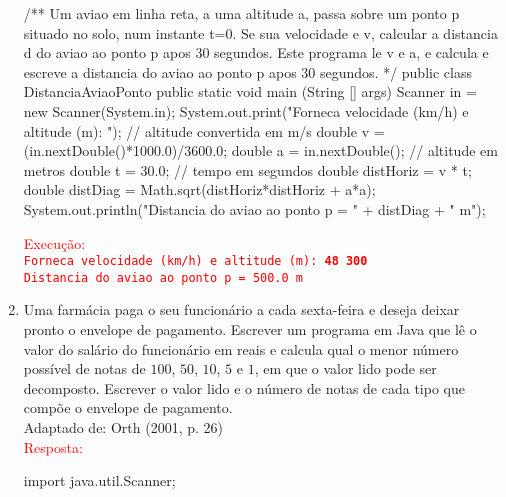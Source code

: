 \documentclass[onecolumn,a4paper,10pt]{report}
\newcommand{\+}{\, + \,}
\newcommand{\<}{\hspace*{-0.4cm}}
\begin{document}
\begin{enumerate}[1.]
\begin{javacode}
/**
   Um aviao em linha reta, a uma altitude a, passa sobre um ponto p
   situado no solo, num instante t=0. Se sua velocidade e v, calcular
   a distancia d do aviao ao ponto p apos 30 segundos. Este programa
   le v e a, e calcula e escreve a distancia do aviao ao ponto p
   apos 30 segundos.
*/
public class DistanciaAviaoPonto {
    public static void main (String [] args) {
        Scanner in = new Scanner(System.in);
        System.out.print("Forneca velocidade (km/h) e altitude (m): ");
        // altitude convertida em m/s
        double v  = (in.nextDouble()*1000.0)/3600.0;
        double a  = in.nextDouble();  // altitude em metros
        double t = 30.0; // tempo em segundos
        double distHoriz = v * t;
        double distDiag = Math.sqrt(distHoriz*distHoriz + a*a);
        System.out.println("Distancia do aviao ao ponto p = " + distDiag + " m");
    }
}
\end{javacode}
\textcolor{red}{Execução:\\
\texttt{Forneca velocidade (km/h) e altitude (m): \textbf{48 300}\\
Distancia do aviao ao ponto p = 500.0 m}
}

\item Uma farmácia paga o seu funcionário a cada sexta-feira e deseja deixar pronto o envelope de pagamento. Escrever um programa em Java que lê o valor do salário do funcionário em reais e calcula qual o menor número possível de notas de $100$, $50$, $10$, $5$ e $1$, em que o valor lido pode ser decomposto. Escrever o valor lido e o número de notas de cada tipo que compõe o envelope de pagamento.\\
{\tiny Adaptado de: Orth (2001, p. 26)}\\
\textcolor{red}{Resposta:}\\
\begin{javacode}
import java.util.Scanner;


\end{javacode}
\end{enumerate}
\end{document}
